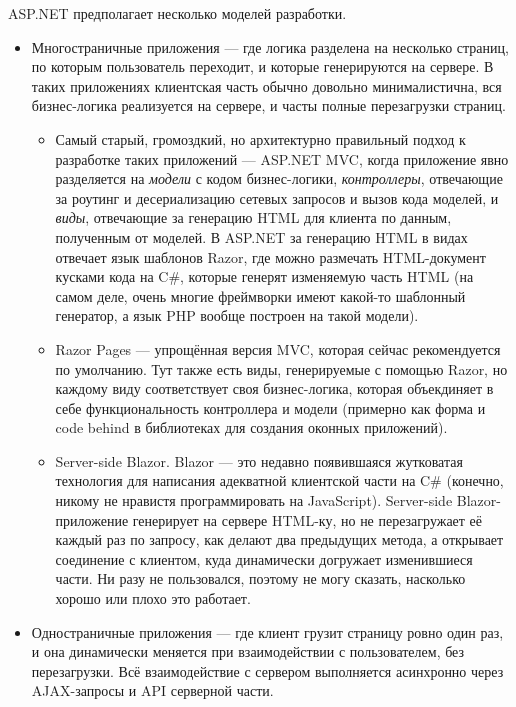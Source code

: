 \documentclass{../../text-style}
\begin{document}
ASP.NET предполагает несколько моделей разработки.

\begin{itemize}
    \item Многостраничные приложения --- где логика разделена на несколько страниц, по которым пользователь переходит, и которые генерируются на сервере. В таких приложениях клиентская часть обычно довольно минималистична, вся бизнес-логика реализуется на сервере, и часты полные перезагрузки страниц.
    \begin{itemize}
        \item Самый старый, громоздкий, но архитектурно правильный подход к разработке таких приложений --- ASP.NET MVC, когда приложение явно разделяется на \emph{модели} с кодом бизнес-логики, \emph{контроллеры}, отвечающие за роутинг и десериализацию сетевых запросов и вызов кода моделей, и \emph{виды}, отвечающие за генерацию HTML для клиента по данным, полученным от моделей. В ASP.NET за генерацию HTML в видах отвечает язык шаблонов Razor, где можно размечать HTML-документ кусками кода на C\#, которые генерят изменяемую часть HTML (на самом деле, очень многие фреймворки имеют какой-то шаблонный генератор, а язык PHP вообще построен на такой модели).
        \item Razor Pages --- упрощённая версия MVC, которая сейчас рекомендуется по умолчанию. Тут также есть виды, генерируемые с помощью Razor, но каждому виду соответствует своя бизнес-логика, которая объекдиняет в себе функциональность контроллера и модели (примерно как форма и code behind в библиотеках для создания оконных приложений).
        \item Server-side Blazor. Blazor --- это недавно появившаяся жутковатая технология для написания адекватной клиентской части на C\# (конечно, никому не нравистя программировать на JavaScript). Server-side Blazor-приложение генерирует на сервере HTML-ку, но не перезагружает её каждый раз по запросу, как делают два предыдущих метода, а открывает соединение с клиентом, куда динамически догружает изменившиеся части. Ни разу не пользовался, поэтому не могу сказать, насколько хорошо или плохо это работает.
    \end{itemize}
    \item Одностраничные приложения --- где клиент грузит страницу ровно один раз, и она динамически меняется при взаимодействии с пользователем, без перезагрузки. Всё взаимодействие с сервером выполняется асинхронно через AJAX-запросы и API серверной части.
    \begin{itemize}

\end{itemize}
\end{itemize}
\end{document}
